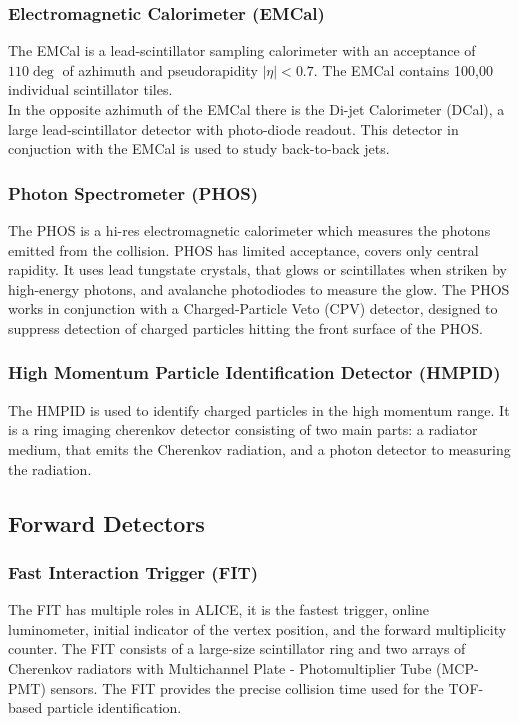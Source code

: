 \documentclass[12pt,a4paper,twoside]{report}
\begin{document}
\subsubsection{Electromagnetic Calorimeter (EMCal)}
The EMCal is a lead-scintillator sampling calorimeter with an acceptance of $110\deg$ of azhimuth and pseudorapidity $|\eta|<0.7$. The EMCal contains 100,00 individual scintillator tiles.\\
In the opposite azhimuth of the EMCal there is the Di-jet Calorimeter (DCal), a large lead-scintillator detector with photo-diode readout. This detector in conjuction with the EMCal is used to study back-to-back jets.
\subsubsection{Photon Spectrometer (PHOS)}
The PHOS is a hi-res electromagnetic calorimeter which measures the photons emitted from the collision. PHOS has limited acceptance, covers only central rapidity. It uses lead tungstate crystals, that glows or scintillates when striken by high-energy photons, and avalanche photodiodes to measure the glow. The PHOS works in conjunction with a Charged-Particle Veto (CPV) detector, designed to suppress detection of charged particles hitting the front surface of the PHOS.
\subsubsection{High Momentum Particle Identification Detector (HMPID)}
The HMPID is used to identify charged particles in the high momentum range. It is a ring imaging cherenkov detector consisting of two main parts: a radiator medium, that emits the Cherenkov radiation, and a photon detector to measuring the radiation.
\subsection{Forward Detectors}
\subsubsection{Fast Interaction Trigger (FIT)}
The FIT has multiple roles in ALICE, it is the fastest trigger, online luminometer, initial indicator of the vertex position, and the forward multiplicity counter. The FIT consists of a large-size scintillator ring and two arrays of Cherenkov radiators with Multichannel Plate - Photomultiplier Tube (MCP-PMT) sensors. The FIT provides the precise collision time used for the TOF-based particle identification.
\end{document}
